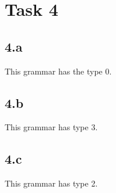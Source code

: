 \chapter{Task 4}
\section{4.a}
This grammar has the type 0.

\section{4.b}
This grammar has type 3.

\section{4.c}
This grammar has type 2.

